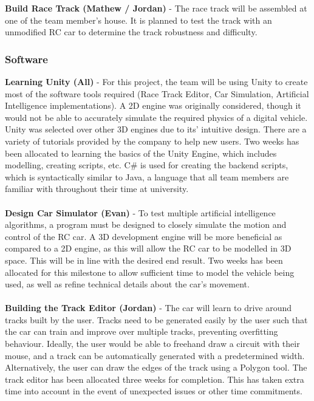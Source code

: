 \documentclass[8pt]{article}
\begin{document}
\newpage


%
%
%

\textbf{Build Race Track (Mathew  / Jordan)} - The race track will be assembled at one of the team member’s house. It is planned to test the track with an unmodified RC car to determine the track robustness and difficulty.

\subsubsection{Software}
\textbf{Learning Unity (All)} - For this project, the team will be using Unity to create most of the software tools required (Race Track Editor, Car Simulation, Artificial Intelligence implementations). A 2D engine was originally considered, though it would not be able to accurately simulate the required physics of  a digital vehicle. Unity was selected over other 3D engines due to its’ intuitive design. There are a variety of tutorials provided by the company to help new users. Two weeks has been allocated to learning the basics of the Unity Engine, which includes modelling, creating scripts, etc. C\# is used for creating the backend scripts, which is syntactically similar to Java, a language that all team members are familiar with throughout their time at university.
\\\\
\textbf{Design Car Simulator (Evan)} - To test multiple artificial intelligence algorithms, a program must be designed to closely simulate the motion and control of the RC car. A 3D development engine will be more beneficial as compared to a 2D engine, as this will allow the RC car to be modelled in 3D space. This will be in line with the desired end result. Two weeks has been allocated for this milestone to allow sufficient time to model the vehicle being used, as well as refine technical details about the car’s movement.
\\\\
\textbf{Building the Track Editor (Jordan)} - The car will learn to drive around tracks built by the user. Tracks need to be generated easily by the user such that the car can train and improve over multiple tracks, preventing overfitting behaviour. Ideally, the user would be able to freehand draw a circuit with their mouse, and a track can be automatically generated with a predetermined width. Alternatively, the user can draw the edges of the track using a Polygon tool. The track editor has been allocated three weeks for completion. This has taken extra time into account in the event of unexpected issues or other time commitments.
\end{document}
